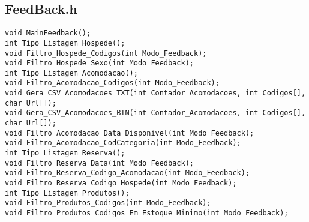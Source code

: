 \documentclass{article}
\begin{document}
\subsection{FeedBack.h}
\begin{lstlisting}
void MainFeedback();
int Tipo_Listagem_Hospede();
void Filtro_Hospede_Codigos(int Modo_Feedback); 
void Filtro_Hospede_Sexo(int Modo_Feedback);  
int Tipo_Listagem_Acomodacao();
void Filtro_Acomodacao_Codigos(int Modo_Feedback);  
void Gera_CSV_Acomodacoes_TXT(int Contador_Acomodacoes, int Codigos[], char Url[]);
void Gera_CSV_Acomodacoes_BIN(int Contador_Acomodacoes, int Codigos[], char Url[]);
void Filtro_Acomodacao_Data_Disponivel(int Modo_Feedback);
void Filtro_Acomodacao_CodCategoria(int Modo_Feedback);
int Tipo_Listagem_Reserva();
void Filtro_Reserva_Data(int Modo_Feedback);
void Filtro_Reserva_Codigo_Acomodacao(int Modo_Feedback);
void Filtro_Reserva_Codigo_Hospede(int Modo_Feedback);
int Tipo_Listagem_Produtos();
void Filtro_Produtos_Codigos(int Modo_Feedback);
void Filtro_Produtos_Codigos_Em_Estoque_Minimo(int Modo_Feedback);
\end{lstlisting}
\end{document}
